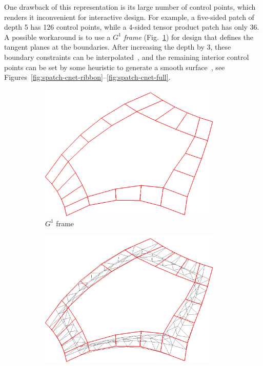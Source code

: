 \documentclass[9pt,academicons]{article}
\begin{document}
One drawback of this representation is its large number of control points, which renders it
inconvenient for interactive design. For example, a five-sided patch of depth 5 has 126 control
points, while a 4-sided tensor product patch has only 36. A possible workaround is to use a
$G^1$ \emph{frame} (Fig.~\ref{fig:spatch-ribbon})
for design that defines the tangent planes at the boundaries.
After increasing the depth by 3, these boundary constraints can be interpolated~\cite{Loop:1990},
and the remaining interior control points can be set by some heuristic to generate a smooth
surface~\cite{Salvi:2019:KEPAF}, see
Figures~\ref{fig:spatch-cnet-ribbon}--\ref{fig:spatch-cnet-full}.
\begin{figure}
  {
    \begin{subfigure}{0.32\textwidth}
      \centering
      \includegraphics[width = 0.95\textwidth]{images/5-5-bezier-ribbon.png}
      \caption{$G^1$ frame}
      \label{fig:spatch-ribbon}
    \end{subfigure}
    \hfill
    \begin{subfigure}{0.32\textwidth}
      \centering
      \includegraphics[width = 0.95\textwidth]{images/5-5-cnet-ribbon.png}

\end{subfigure}}
\end{figure}
\end{document}
